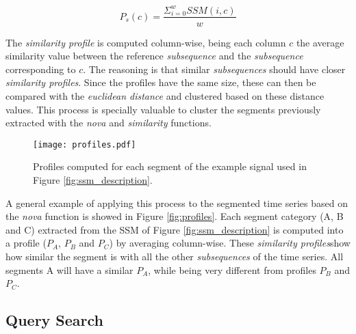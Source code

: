 \begin{equation}
P_s(c) = \frac{\Sigma_{i=0}^w SSM(i, c)}{w}
\end{equation}

The \textit{similarity profile} is computed column-wise, being each column $c$ the average similarity value between the reference \textit{subsequence} and the \textit{subsequence} corresponding to $c$. The reasoning is that similar \textit{subsequences} should have closer \textit{similarity profiles}. Since the profiles have the same size, these can then be compared with the \textit{euclidean distance} and clustered based on these distance values. This process is specially valuable to cluster the segments previously extracted with the \textit{nova} and \textit{similarity} functions.

\begin{figure}
\centering
\texttt{[image: profiles.pdf]}
\caption{Profiles computed for each segment of the example signal used in Figure \ref{fig:ssm_description}.}
\end{figure}

A general example of applying this process to the segmented time series based on the \textit{nova} function is showed in Figure \ref{fig:profiles}. Each segment category (A, B and C) extracted from the \gls{SSM} of Figure \ref{fig:ssm_description} is computed into a profile ($P_A$, $P_B$ and $P_C$) by averaging column-wise. These \textit{similarity profiles}show how similar the segment is with all the other \textit{subsequences} of the time series. All segments A will have a similar $P_A$, while being very different from profiles $P_B$ and $P_C$. 

\subsection{Query Search}


